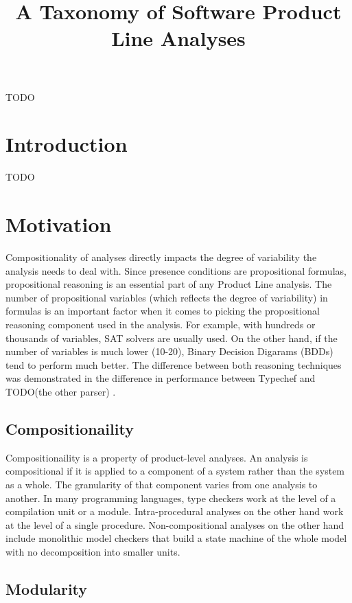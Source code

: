 \documentclass[11pt]{article}
\begin{document}
\title{A Taxonomy of Software Product Line Analyses}
\maketitle

\abstract
TODO

\section{Introduction}
TODO

\section{Motivation}
Compositionality of analyses directly impacts the degree of variability the analysis needs to deal with. Since presence conditions are propositional formulas, propositional reasoning is an essential part of any Product Line analysis. The number of propositional variables (which reflects the degree of variability) in formulas is an important factor when it comes to picking the propositional reasoning component used in the analysis. For example, with hundreds or thousands of variables, SAT solvers are usually used. On the other hand, if the number of variables is much lower (10-20), Binary Decision Digarams (BDDs) tend to perform much better. The difference between both reasoning techniques was demonstrated in the difference in performance between Typechef \cite{} and TODO(the other parser) \cite{}.

\subsection{Compositionaility}

Compositionaility is a property of product-level analyses. An analysis is compositional if it is applied to a component of a system rather than the system as a whole. The granularity of that component varies from one analysis to another. In many programming languages, type checkers work at the level of a compilation unit or a module. Intra-procedural analyses on the other hand work at the level of a single procedure. Non-compositional analyses on the other hand include monolithic model checkers that build a state machine of the whole model with no decomposition into smaller units.

\subsection{Modularity}
\end{document}
